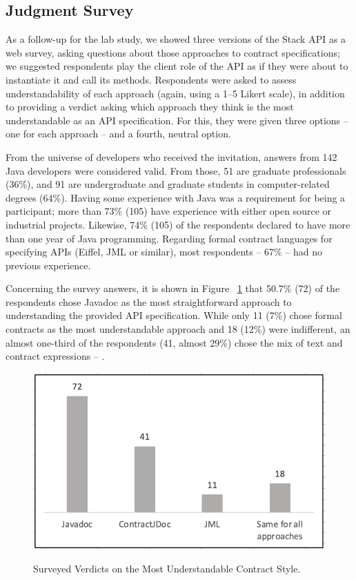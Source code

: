\subsection{Judgment Survey}
\label{sec:surveyResults}

As a follow-up for the lab study, we showed three versions of the Stack API as a web survey, asking questions about those approaches to contract specifications; we suggested respondents play the client role of the API as if they were about to instantiate it and call its methods.
Respondents were asked to assess understandability of each approach (again, using a 1--5 Likert scale), in addition to providing a verdict asking which approach they think is the most understandable as an API specification. For this, they were given three options -- one for each approach -- and a fourth, neutral option.

From the universe of developers who received the invitation, answers from 142 Java developers were considered valid.
From those, 51 are graduate professionals (36\%), and 91 are undergraduate and graduate students in computer-related degrees (64\%).
Having some experience with Java was a requirement for being a participant; more than 73\% (105) have experience with either open source or industrial projects. Likewise, 74\% (105) of the respondents declared to have more than one year of Java programming.
Regarding formal contract languages for specifying APIs (Eiffel, JML or similar), most respondents -- 67\% -- had no previous experience. 


Concerning the survey answers, it is shown in Figure
~\ref{fig:mostUnderstandable} that 50.7\% (72) of the respondents chose Javadoc as the most straightforward approach to understanding the provided API specification. 
While only 11 (7\%) chose formal contracts as the most understandable approach and 18 (12\%) were indifferent, an almost one-third of the respondents (41, almost 29\%) chose the mix of text and contract expressions -- \contractjdoc{}.


\begin{figure}
\centering
\includegraphics[width=0.7\linewidth]{figs/mostUnderstandable.png}
\label{fig:mostUnderstandable}
\caption{Surveyed Verdicts on the Most Understandable Contract Style.}
\end{figure}


